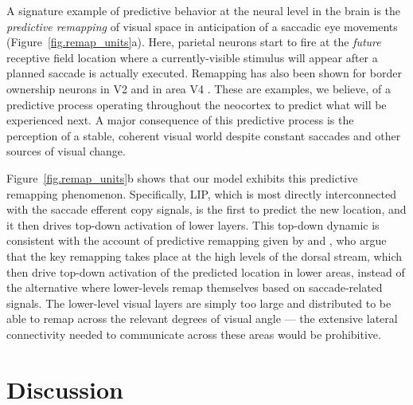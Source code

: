 \documentclass[11pt,twoside]{article}
\newif\myifpdf
\begin{document}
A signature example of predictive behavior at the neural level in the brain is the {\em predictive remapping} of visual space in anticipation of a saccadic eye movements \cite{DuhamelColbyGoldberg92,ColbyDuhamelGoldberg97,GottliebKusunokiGoldberg98,NakamuraColby02,MarinoMazer16} (Figure~\ref{fig.remap_units}a).  Here, parietal neurons start to fire at the {\em future} receptive field location where a currently-visible stimulus will appear after a planned saccade is actually executed. Remapping has also been shown for border ownership neurons in V2 \cite{OHerronHeydt13} and in area V4 \cite{NeupaneGuittonPack16}. These are examples, we believe, of a predictive process operating throughout the neocortex to predict what will be experienced next.  A major consequence of this predictive process is the perception of a stable, coherent visual world despite constant saccades and other sources of visual change. 

Figure~\ref{fig.remap_units}b shows that our model exhibits this predictive remapping phenomenon.  Specifically, LIP, which is most directly interconnected with the saccade efferent copy signals, is the first to predict the new location, and it then drives top-down activation of lower layers.  This top-down dynamic is consistent with the account of predictive remapping given by  and , who argue that the key remapping takes place at the high levels of the dorsal stream, which then drive top-down activation of the predicted location in lower areas, instead of the alternative where lower-levels remap themselves based on saccade-related signals.  The lower-level visual layers are simply too large and distributed to be able to remap across the relevant degrees of visual angle --- the extensive lateral connectivity needed to communicate across these areas would be prohibitive.

\section{Discussion}
\end{document}
